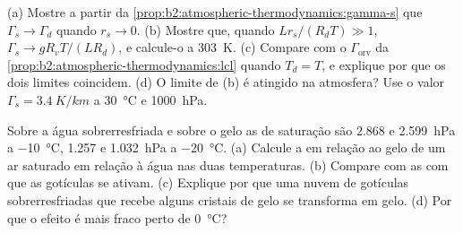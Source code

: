 \begin{exercise}[$\star\star\star$]\label{exo:b2:atmospheric-thermodynamics:11}
(a) Mostre a partir da \cref{prop:b2:atmospheric-thermodynamics:gamma-s} que $\Gamma_s \to \Gamma_d$
quando $r_s \to 0$. (b) Mostre que, quando $Lr_s/(R_dT) \gg 1$, $\Gamma_s \to gR_vT/(LR_d)$, e
calcule-o a \qty{303}{K}. (c) Compare com o $\Gamma_{\text{orv}}$ da
\cref{prop:b2:atmospheric-thermodynamics:lcl} quando $T_d = T$, e explique por que os dois limites
coincidem. (d) O limite de (b) é atingido na atmosfera? Use o valor $\Gamma_s =
\qty{3.4}{K/km}$ a \qty{30}{\celsius} e \qty{1000}{hPa}.
\end{exercise}

\begin{exercise}[$\star\star\star$]\label{exo:b2:atmospheric-thermodynamics:12}
Sobre a água sobrerresfriada e sobre o gelo as  de saturação são 2.868 e
\qty{2.599}{hPa} a \qty{-10}{\celsius}, 1.257 e \qty{1.032}{hPa} a \qty{-20}{\celsius}.
(a) Calcule a  em relação ao gelo de um ar saturado em relação à água nas duas temperaturas. (b)
Compare com as  com que as gotículas se ativam. (c) Explique por que uma nuvem de
gotículas sobrerresfriadas que recebe alguns cristais de gelo se transforma em gelo. (d) Por que o efeito é
mais fraco perto de \qty{0}{\celsius}?
\end{exercise}

